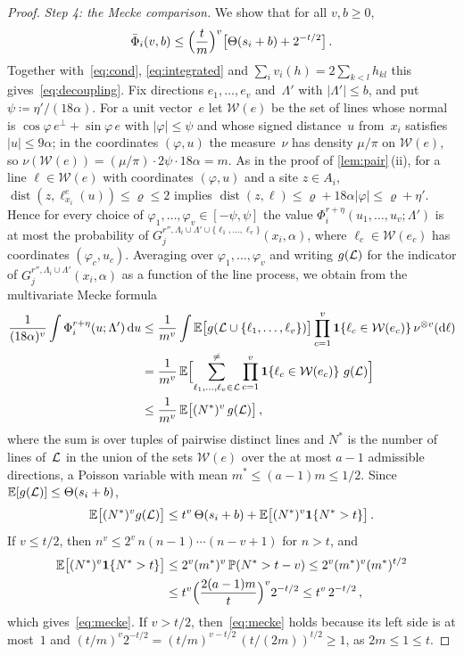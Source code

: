 \documentclass[11pt,letterpaper]{article}
\DeclareMathOperator{\dist}{dist}
\newcommand{\cW}{\mathcal W}
\begin{document}
\begin{proof}
\emph{Step 4: the Mecke comparison.} We show that for all $v,b\ge0$,
\begin{equation}
\label{eq:mecke}
  \bar\Phi_i(v,b)\le\Bigl(\frac tm\Bigr)^{v}\bigl[\Theta(s_i+b)+2^{-t/2}\bigr]\,.
\end{equation}
Together with~\eqref{eq:cond}, \eqref{eq:integrated} and $\sum_iv_i(h)=2\sum_{k<l}h_{kl}$ this gives~\eqref{eq:decoupling}. Fix directions $e_1,\dots,e_v$ and~$\Lambda'$ with $\lvert\Lambda'\rvert\le b$, and put $\psi\coloneqq\eta'/(18\alpha)$. For a unit vector~$e$ let $\cW(e)$ be the set of lines whose normal is $\cos\varphi\,e^\perp+\sin\varphi\,e$ with $\lvert\varphi\rvert\le\psi$ and whose signed distance~$u$ from~$x_i$ satisfies $\lvert u\rvert\le9\alpha$; in the coordinates $(\varphi,u)$ the measure~$\nu$ has density $\mu/\pi$ on $\cW(e)$, so $\nu(\cW(e))=(\mu/\pi)\cdot2\psi\cdot18\alpha=m$. As in the proof of \cref{lem:pair}\,(ii), for a line $\ell\in\cW(e)$ with coordinates $(\varphi,u)$ and a site $z\in A_i$, $\dist(z,\ell^e_{x_i}(u))\le\varrho\le2$ implies $\dist(z,\ell)\le\varrho+18\alpha\lvert\varphi\rvert\le\varrho+\eta'$. Hence for every choice of $\varphi_1,\dots,\varphi_v\in[-\psi,\psi]$ the value $\Phi_i^{r+\eta}(u_1,\dots,u_v;\Lambda')$ is at most the probability of $G_j^{r'',\Lambda_i\cup\Lambda'\cup\{\ell_1,\dots,\ell_v\}}(x_i,\alpha)$, where $\ell_c\in\cW(e_c)$ has coordinates $(\varphi_c,u_c)$. Averaging over $\varphi_1,\dots,\varphi_v$ and writing $g(\mathcal L)$ for the indicator of $G_j^{r'',\Lambda_i\cup\Lambda'}(x_i,\alpha)$ as a function of the line process, we obtain from the multivariate Mecke formula~\cite[Theorem~4.4]{LP17}
\begin{align*}
  \frac1{(18\alpha)^{v}}\int\Phi_i^{r+\eta}(u;\Lambda')\dd u
  &\le\frac1{m^v}\int\E\bigl[g(\cL\cup\{\ell_1,\dots,\ell_v\})\bigr]\prod_{c=1}^v\1\{\ell_c\in\cW(e_c)\}\,\nu^{\otimes v}(\d\ell)\\
  &=\frac1{m^v}\,\E\Bigl[\sum^{\neq}_{\ell_1,\dots,\ell_v\in\cL}\prod_{c=1}^v\1\{\ell_c\in\cW(e_c)\}\ g(\cL)\Bigr]\\
  &\le\frac1{m^v}\,\E\bigl[(N^*)^v\,g(\cL)\bigr]\,,
\end{align*}
where the sum is over tuples of pairwise distinct lines and $N^*$ is the number of lines of~$\mathcal L$ in the union of the sets $\cW(e)$ over the at most $a-1$ admissible directions, a Poisson variable with mean $m^*\le(a-1)m\le1/2$. Since $\mathbb E[g(\mathcal L)]\le\Theta(s_i+b)$,
\begin{equation*}
  \mathbb E\bigl[(N^*)^v g(\mathcal L)\bigr]\le t^v\,\Theta(s_i+b)+\mathbb E\bigl[(N^*)^v\mathbf{1}\{N^*>t\}\bigr]\,.
\end{equation*}
If $v\le t/2$, then $n^v\le2^v\,n(n-1)\cdots(n-v+1)$ for $n>t$, and
\begin{align*}
  \mathbb E\bigl[(N^*)^v\mathbf{1}\{N^*>t\}\bigr]&\le2^v(m^*)^v\,\mathbb P(N^*>t-v)\le2^v(m^*)^v(m^*)^{t/2}\\
  &\le t^v\Bigl(\frac{2(a-1)m}{t}\Bigr)^v2^{-t/2}\le t^v\,2^{-t/2}\,,
\end{align*}
which gives~\eqref{eq:mecke}. If $v>t/2$, then~\eqref{eq:mecke} holds because its left side is at most~$1$ and $(t/m)^v2^{-t/2}=(t/m)^{v-t/2}\,(t/(2m))^{t/2}\ge1$, as $2m\le1\le t$.
\end{proof}
\end{document}
